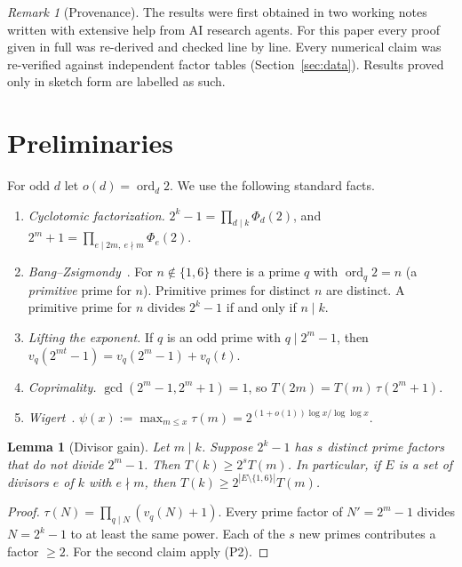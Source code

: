 \documentclass[11pt]{amsart}
\newtheorem{lemma}[theorem]{Lemma}
\theoremstyle{definition}
\theoremstyle{remark}
\newtheorem{remark}[theorem]{Remark}
\newcommand{\ord}{\operatorname{ord}}
\begin{document}
\begin{remark}[Provenance]
The results were first obtained in two working notes written with extensive help from AI research agents. For this
paper every proof given in full was re-derived and checked line by line. Every numerical claim was re-verified against
independent factor tables (Section~\ref{sec:data}). Results proved only in sketch form are labelled as such.
\end{remark}

\section{Preliminaries}
For odd $d$ let $o(d)=\ord_d2$. We use the following standard facts.

\begin{enumerate}
\item[(P1)] \emph{Cyclotomic factorization.} $2^k-1=\prod_{d\mid k}\Phi_d(2)$, and $2^m+1=\prod_{e\mid2m,\ e\nmid m}\Phi_e(2)$.
\item[(P2)] \emph{Bang--Zsigmondy}~\cite{Ba86,Zs92}. For $n\notin\{1,6\}$ there is a prime $q$ with $\ord_q2=n$
(a \emph{primitive} prime for $n$). Primitive primes for distinct $n$ are distinct. A primitive prime for $n$ divides
$2^k-1$ if and only if $n\mid k$.
\item[(P3)] \emph{Lifting the exponent.} If $q$ is an odd prime with $q\mid 2^m-1$, then
$v_q(2^{mt}-1)=v_q(2^m-1)+v_q(t)$.
\item[(P4)] \emph{Coprimality.} $\gcd(2^m-1,2^m+1)=1$, so $T(2m)=T(m)\,\tau(2^m+1)$.
\item[(P5)] \emph{Wigert}~\cite{Wi07}. $\psi(x):=\max_{m\le x}\tau(m)=2^{(1+o(1))\log x/\log\log x}$.
\end{enumerate}

\begin{lemma}[Divisor gain]\label{lem:gain}
Let $m\mid k$. Suppose $2^k-1$ has $s$ distinct prime factors that do not divide $2^m-1$. Then $T(k)\ge2^sT(m)$.
In particular, if $E$ is a set of divisors $e$ of $k$ with $e\nmid m$, then $T(k)\ge2^{|E\setminus\{1,6\}|}T(m)$.
\end{lemma}
\begin{proof}
$\tau(N)=\prod_{q\mid N}(v_q(N)+1)$. Every prime factor of $N'=2^m-1$ divides $N=2^k-1$ to at least the same power.
Each of the $s$ new primes contributes a factor $\ge2$. For the second claim apply (P2).
\end{proof}
\end{document}
